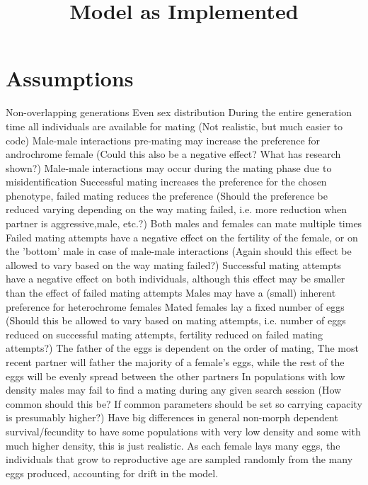 \documentclass{article}
\title{Model as Implemented}
\date{\vspace{-5ex}}
\begin{document}
\maketitle

\section{Assumptions}
Non-overlapping generations \cite{Svensson2005}
Even sex distribution
During the entire generation time all individuals are available for mating (Not realistic, but much easier to code)
Male-male interactions pre-mating may increase the preference for androchrome female (Could this also be a negative effect? What has research shown?)
Male-male interactions may occur during the mating phase due to misidentification \cite{Blow2019}
Successful mating increases the preference for the chosen phenotype, failed mating reduces the preference (Should the preference be reduced varying depending on the way mating failed, i.e. more reduction when partner is aggressive,male, etc.?)
Both males and females can mate multiple times \cite{Gosden2007}
Failed mating attempts have a negative effect on the fertility of the female, or on the 'bottom' male in case of male-male interactions (Again should this effect be allowed to vary based on the way mating failed?)
Successful mating attempts have a negative effect on both individuals, although this effect may be smaller than the effect of failed mating attempts
Males may have a (small) inherent preference for heterochrome females \cite{Blow2019}
Mated females lay a fixed number of eggs (Should this be allowed to vary based on mating attempts, i.e. number of eggs reduced on successful mating attempts, fertility reduced on failed mating attempts?)
The father of the eggs is dependent on the order of mating, The most recent partner will father the majority of a female's eggs, while the rest of the eggs will be evenly spread between the other partners \cite{Cordoba2003}
In populations with low density males may fail to find a mating during any given search session (How common should this be? If common parameters should be set so carrying capacity is presumably higher?)
Have big differences in general non-morph dependent survival/fecundity to have some populations with very low density and some with much higher density, this is just realistic.
As each female lays many eggs, the individuals that grow to reproductive age are sampled randomly from the many eggs produced, accounting for drift in the model.
\end{document}

